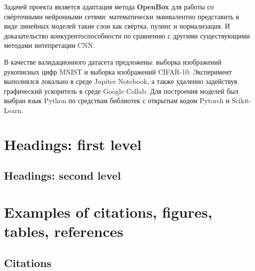 \documentclass{article}
\begin{document}
Задачей проекта является адаптация метода \textbf{OpenBox} для работы со свёрточными нейронными сетями: математически эквивалентно представить в виде линейных моделей такие слои как свёртка, пулинг и нормализация. И доказательство конкурентоспособности по сравнению с другими существующими методами интепретации CNN.

В качестве валидационного датасета предложены: выборка изображений рукописных цифр MNIST и выборка изображений CIFAR-10. Эксперимент выполнялся локально в среде Jupiter Notebook, а также удаленно задействуя графический ускоритель в среде Google Collab. Для построения моделей был выбран язык Python по средствам библиотек с открытым кодом Pytorch и Scikit-Learn.



\section{Headings: first level}
\label{sec:headings}


\subsection{Headings: second level}





\section{Examples of citations, figures, tables, references}

\subsection{Citations}
\end{document}
